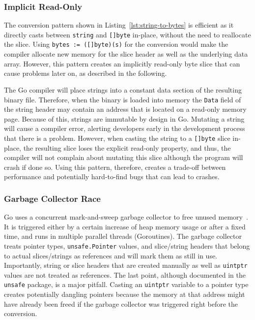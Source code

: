 \subsubsection*{Implicit Read-Only}

The conversion pattern shown in Listing~\ref{lst:string-to-bytes} is efficient as it directly casts between \texttt{string} and \texttt{[]byte} in-place, without the need to reallocate the slice.
Using \texttt{bytes := ([]byte)(s)} for the conversion would make the compiler allocate new memory for the slice header as well as the underlying data array.
However, this pattern creates an implicitly read-only byte slice that can cause problems later on, as described in the following.

The Go compiler will place strings into a constant data section of the resulting binary file.
Therefore, when the binary is loaded into memory the \texttt{Data} field of the string header may contain an address that is located on a read-only memory page.
Because of this, strings are immutable by design in Go.
Mutating a string will cause a compiler error, alerting developers early in the development process that there is a problem.
However, when casting the string to a \texttt{[]byte} slice in-place, the resulting slice loses the explicit read-only property, and thus, the compiler will not complain about mutating this slice although the program will crash if done so.
Using this pattern, therefore, creates a trade-off between performance and potentially hard-to-find bugs that can lead to crashes.


\subsubsection*{Garbage Collector Race}

Go uses a concurrent mark-and-sweep garbage collector to free unused memory~\cite{sibiryov2017}.
It is triggered either by a certain increase of heap memory usage or after a fixed time, and runs in multiple parallel threads (Goroutines).
The garbage collector treats pointer types, \texttt{unsafe.Pointer} values, and slice/string headers that belong to actual slices/strings as references and will mark them as still in use. %
Importantly, string or slice headers that are created manually as well as \texttt{uintptr} values are not treated as references.
The last point, although documented in the \texttt{unsafe} package, is a major pitfall.
Casting an \texttt{uintptr} variable to a pointer type  creates potentially dangling pointers because the memory at that address might have already been freed if the garbage collector was triggered right before the conversion.

